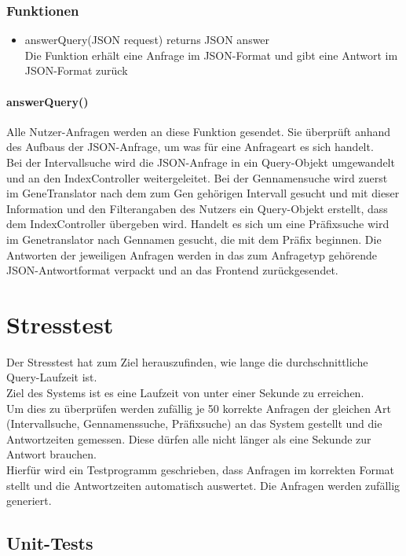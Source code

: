 \subsubsection{Funktionen}
\begin{itemize}
\item answerQuery(JSON request) returns JSON answer\\
Die Funktion erhält eine Anfrage im JSON-Format und gibt eine Antwort im JSON-Format zurück
\end{itemize}
\paragraph{answerQuery()}
Alle Nutzer-Anfragen werden an diese Funktion gesendet. Sie überprüft anhand des Aufbaus der JSON-Anfrage, um was für eine Anfrageart es sich handelt.\\ Bei der Intervallsuche wird die JSON-Anfrage in ein Query-Objekt umgewandelt und an den IndexController weitergeleitet. Bei der Gennamensuche wird zuerst im GeneTranslator nach dem zum Gen gehörigen Intervall gesucht und mit dieser Information und den Filterangaben des Nutzers ein Query-Objekt erstellt, dass dem IndexController übergeben wird. Handelt es sich um eine Präfixsuche wird im Genetranslator nach Gennamen gesucht, die mit dem Präfix beginnen. Die Antworten der jeweiligen Anfragen werden in das zum Anfragetyp gehörende JSON-Antwortformat verpackt und an das Frontend zurückgesendet.\\

\newpage
\section{Stresstest}
Der Stresstest hat zum Ziel herauszufinden, wie lange die durchschnittliche Query-Laufzeit ist.\\
Ziel des Systems ist es eine Laufzeit von unter einer Sekunde zu erreichen.\\
Um dies zu überprüfen werden zufällig je 50 korrekte Anfragen der gleichen Art (Intervallsuche, Gennamenssuche, Präfixsuche) an das System gestellt und die Antwortzeiten gemessen. Diese dürfen alle nicht länger als eine Sekunde zur Antwort brauchen.\\
Hierfür wird ein Testprogramm geschrieben, dass Anfragen im korrekten Format stellt und die Antwortzeiten automatisch auswertet. Die Anfragen werden zufällig generiert.

\newpage
\subsection{Unit-Tests}
